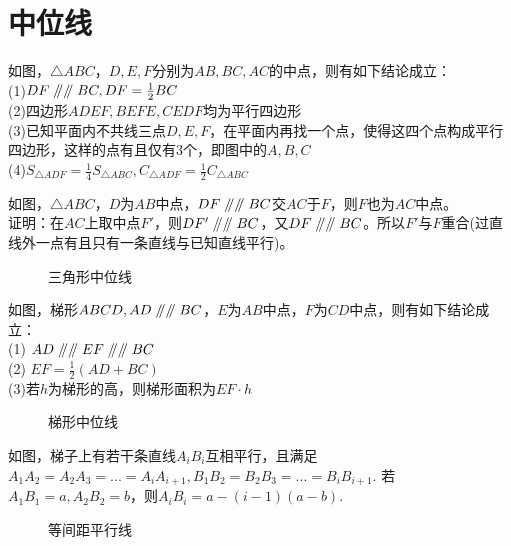 \section{中位线}
\begin{theorem}
    如图，$\triangle ABC$，$D,E,F$分别为$AB,BC,AC$的中点，则有如下结论成立：\\
    (1)$DF\mathrel{/\mkern-5mu/}\mathrel{/\mkern-5mu/} BC,DF=\frac{1}{2}BC$ \\
    (2)四边形$ADEF,BEFE,CEDF$均为平行四边形 \\
    (3)已知平面内不共线三点$D,E,F$，在平面内再找一个点，使得这四个点构成平行四边形，这样的点有且仅有3个，即图中的$A,B,C$ \\
    (4)$S_{\triangle ADF}=\frac{1}{4}S_{\triangle ABC},C_{\triangle ADF}=\frac{1}{2}C_{\triangle ABC}$ \\
\end{theorem}
\begin{corollary}
    如图，$\triangle ABC$，$D$为$AB$中点，$DF \mathrel{/\mkern-5mu/} \mathrel{/\mkern-5mu/} BC$交$AC$于$F$，则$F$也为$AC$中点。\\
    证明：在$AC$上取中点$F'$，则$DF'\mathrel{/\mkern-5mu/} \mathrel{/\mkern-5mu/} BC$，又$DF\mathrel{/\mkern-5mu/} \mathrel{/\mkern-5mu/} BC$。所以$F'$与$F$重合(过直线外一点有且只有一条直线与已知直线平行)。
\end{corollary}
\begin{figure}[H]
    \centering
    \resizebox{4cm}{!}{}
    \caption{三角形中位线}
\end{figure}
\begin{theorem}
    如图，梯形$ABCD,AD\mathrel{/\mkern-5mu/} \mathrel{/\mkern-5mu/} BC$，$E$为$AB$中点，$F$为$CD$中点，则有如下结论成立：\\
    (1) $AD \mathrel{/\mkern-5mu/} \mathrel{/\mkern-5mu/} EF \mathrel{/\mkern-5mu/} \mathrel{/\mkern-5mu/} BC$ \\
    (2) $EF=\frac{1}{2}(AD+BC)$ \\
    (3)若$h$为梯形的高，则梯形面积为$EF·h$ \\
\end{theorem}
\begin{figure}[H]
    \centering
    \resizebox{4cm}{!}{}
    \caption{梯形中位线}
\end{figure}
\begin{definition}
    如图，梯子上有若干条直线$A_iB_i$互相平行，且满足$A_1A_2=A_2A_3=...=A_iA_{i+1},B_1B_2=B_2B_3=...=B_iB_{i+1}.$
    若$A_1B_1=a,A_2B_2=b$，则$A_iB_i=a-(i-1)(a-b).$
\end{definition}
\begin{figure}[H]
    \centering
    \resizebox{4cm}{!}{}
    \caption{等间距平行线}
\end{figure}
